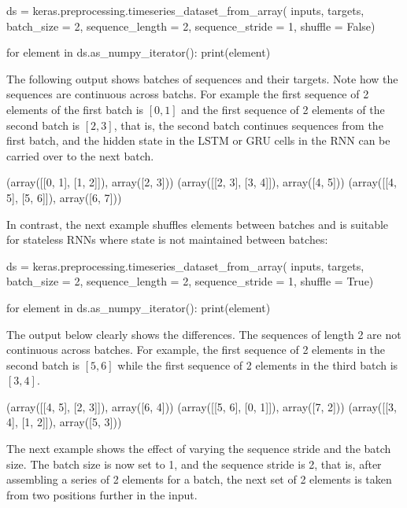 \begin{withcode}
\begin{pythoncode}
ds = keras.preprocessing.timeseries_dataset_from_array(
     inputs, 
     targets,
     batch_size = 2, 
     sequence_length = 2, 
     sequence_stride = 1, 
     shuffle = False)
     
for element in ds.as_numpy_iterator():
     print(element)
\end{pythoncode}

The following output shows batches of sequences and their targets. Note how the sequences are continuous across batchs. For example the first sequence of 2 elements of the first batch is $[0, 1]$ and the first sequence of 2 elements of the second batch is $[2, 3]$, that is, the second batch continues sequences from the first batch, and the hidden state in the LSTM or GRU cells in the RNN can be carried over to the next batch. 
 
\begin{textcode}
(array([[0, 1],
       [1, 2]]), array([2, 3]))
(array([[2, 3],
       [3, 4]]), array([4, 5]))
(array([[4, 5],
       [5, 6]]), array([6, 7]))
\end{textcode}

In contrast, the next example shuffles elements between batches and is suitable for stateless RNNs where state is not maintained between batches:

\begin{pythoncode}
ds = keras.preprocessing.timeseries_dataset_from_array(
     inputs, 
     targets, 
     batch_size = 2, 
     sequence_length = 2, 
     sequence_stride = 1, 
     shuffle = True)
     
for element in ds.as_numpy_iterator():
     print(element)
\end{pythoncode}

The output below clearly shows the differences. The sequences of length 2 are not continuous across batches. For example, the first sequence of 2 elements in the second batch is $[5, 6]$ while the first sequence of 2 elements in the third batch is $[3, 4]$.

\begin{textcode}
(array([[4, 5],
       [2, 3]]), array([6, 4]))
(array([[5, 6],
       [0, 1]]), array([7, 2]))
(array([[3, 4],
       [1, 2]]), array([5, 3]))
\end{textcode}

The next example shows the effect of varying the sequence stride and the batch size. The batch size is now set to 1, and the sequence stride is 2, that is, after assembling a series of 2 elements for a batch, the next set of 2 elements is taken from two positions further in the input.


\end{withcode}
